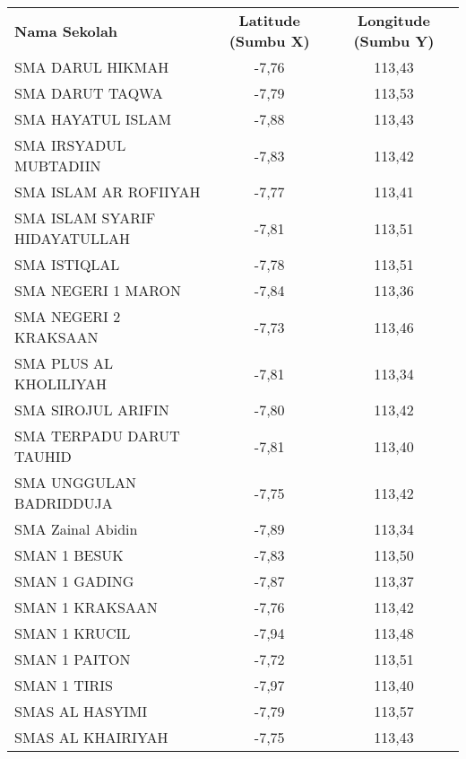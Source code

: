 {
\scriptsize
\begin{longtable}[c]{lcc}
\rowcolor[HTML]{4472C4} 
{\color[HTML]{FFFFFF} \textbf{Nama   Sekolah}} & {\color[HTML]{FFFFFF} \textbf{Latitude (Sumbu X)}} & {\color[HTML]{FFFFFF} \textbf{Longitude (Sumbu Y)}} \\
\rowcolor[HTML]{D9E1F2} 
SMA DARUL HIKMAH                    & -7,76 & 113,43 \\
SMA   DARUT TAQWA                   & -7,79 & 113,53 \\
\rowcolor[HTML]{D9E1F2} 
SMA HAYATUL ISLAM                   & -7,88 & 113,43 \\
SMA   IRSYADUL MUBTADIIN            & -7,83 & 113,42 \\
\rowcolor[HTML]{D9E1F2} 
SMA ISLAM AR ROFIIYAH               & -7,77 & 113,41 \\
SMA   ISLAM SYARIF HIDAYATULLAH     & -7,81 & 113,51 \\
\rowcolor[HTML]{D9E1F2} 
SMA ISTIQLAL                        & -7,78 & 113,51 \\
SMA   NEGERI 1 MARON                & -7,84 & 113,36 \\
\rowcolor[HTML]{D9E1F2} 
SMA NEGERI 2 KRAKSAAN               & -7,73 & 113,46 \\
SMA   PLUS AL KHOLILIYAH            & -7,81 & 113,34 \\
\rowcolor[HTML]{D9E1F2} 
SMA SIROJUL ARIFIN                  & -7,80 & 113,42 \\
SMA   TERPADU DARUT TAUHID          & -7,81 & 113,40 \\
\rowcolor[HTML]{D9E1F2} 
SMA UNGGULAN BADRIDDUJA             & -7,75 & 113,42 \\
SMA   Zainal Abidin                 & -7,89 & 113,34 \\
\rowcolor[HTML]{D9E1F2} 
SMAN 1 BESUK                        & -7,83 & 113,50 \\
SMAN   1 GADING                     & -7,87 & 113,37 \\
\rowcolor[HTML]{D9E1F2} 
SMAN 1 KRAKSAAN                     & -7,76 & 113,42 \\
SMAN   1 KRUCIL                     & -7,94 & 113,48 \\
\rowcolor[HTML]{D9E1F2} 
SMAN 1 PAITON                       & -7,72 & 113,51 \\
SMAN   1 TIRIS                      & -7,97 & 113,40 \\
\rowcolor[HTML]{D9E1F2} 
SMAS AL HASYIMI                     & -7,79 & 113,57 \\
SMAS   AL KHAIRIYAH                 & -7,75 & 113,43 \\

\end{longtable}}
